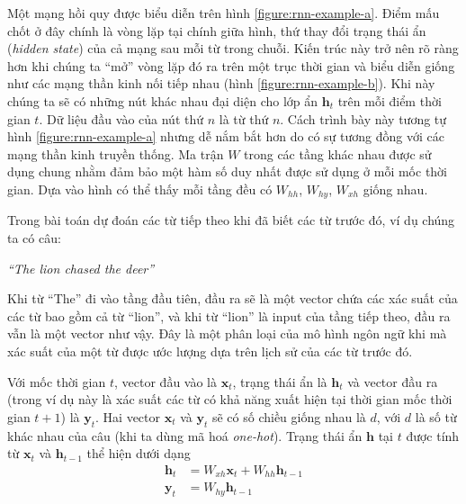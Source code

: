 Một mạng hồi quy được biểu diễn trên hình \ref{figure:rnn-example-a}. Điểm mấu chốt ở đây chính là vòng lặp tại chính giữa hình, thứ thay đổi trạng thái ẩn (\textit{hidden state}) của cả mạng sau mỗi từ trong chuỗi. Kiến trúc này trở nên rõ ràng hơn khi chúng ta “mở” vòng lặp đó ra trên một trục thời gian và biểu diễn giống như các mạng thần kinh nối tiếp nhau (hình \ref{figure:rnn-example-b}). Khi này chúng ta sẽ có những nút khác nhau đại diện cho lớp ẩn $\mathbf h_t$ trên mỗi điểm thời gian $t$. Dữ liệu đầu vào của nút thứ $n$ là từ thứ $n$. Cách trình bày này tương tự hình \ref{figure:rnn-example-a} nhưng dễ nắm bắt hơn do có sự tương đồng với các mạng thần kinh truyền thống. Ma trận $W$ trong các tầng khác nhau được sử dụng chung nhằm đảm bảo một hàm số duy nhất được sử dụng ở mỗi mốc thời gian. Dựa vào hình có thể thấy mỗi tầng đều có $W_{hh}$, $W_{hy}$, $W_{xh}$ giống nhau.

Trong bài toán dự đoán các từ tiếp theo khi đã biết các từ trước đó, ví dụ chúng ta có câu:

\centerline{\textit{``The lion chased the deer''} \cite{Aggarwal2023}}
Khi từ ``The'' đi vào tầng đầu tiên, đầu ra sẽ là một vector chứa các xác suất của các từ bao gồm cả từ ``lion'', và khi từ ``lion'' là input của tầng tiếp theo, đầu ra vẫn là một vector như vậy. Đây là một phân loại của mô hình ngôn ngữ khi mà xác suất của một từ được ước lượng dựa trên lịch sử của các từ trước đó.

Với mốc thời gian $t$, vector đầu vào là $\mathbf x_t$, trạng thái ẩn là $\mathbf h_t$ và vector đầu ra  (trong ví dụ này là xác suất các từ có khả năng xuất hiện tại thời gian mốc thời gian $t+1$) là $\mathbf y_t$. Hai vector $\mathbf x_t$ và $\mathbf y_t$ sẽ có số chiều giống nhau là $d$, với $d$ là số từ khác nhau của câu (khi ta dùng mã hoá \textit{one-hot}). Trạng thái ẩn $\mathbf h$ tại $t$ được tính từ $\mathbf x_t$ và $\mathbf h_{t-1}$ thể hiện dưới dạng
\begin{align}
    \mathbf h_t & =W_{xh}\mathbf x_t+W_{hh}\mathbf h_{t-1}\label{equation:rnn-h} \\
    \mathbf y_t & =W_{hy}\mathbf h_{t-1}\label{equation:rnn-y}
\end{align}

